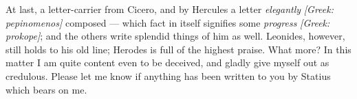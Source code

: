 

 At last, a letter-carrier from Cicero, and by Hercules a letter \textit{elegantly} \textit{[Greek: pepinomenos]} composed --- which fact in itself signifies some \textit{progress} \textit{[Greek: prokope]}; and the others write splendid things of him as well. Leonides, however, still holds to his old line; Herodes is full of the highest praise. What more? In this matter I am quite content even to be deceived, and gladly give myself out as credulous. Please let me know if anything has been written to you by Statius which bears on me.
